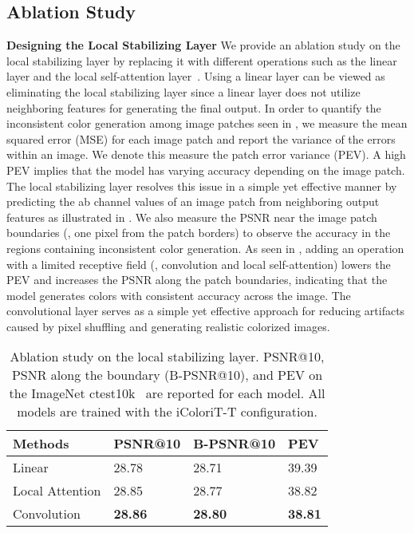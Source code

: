 \documentclass[10pt,twocolumn,letterpaper]{article}
\begin{document}
\subsection{Ablation Study}
\vspace{-0.1cm}
\noindent \textbf{Designing the Local Stabilizing Layer}
\label{sec:quali-ablation}
We provide an ablation study on the local stabilizing layer by replacing it with different operations such as the linear layer and the local self-attention layer~\cite{localattn}. 
Using a linear layer can be viewed as eliminating the local stabilizing layer since a linear layer does not utilize neighboring features for generating the final output. 
In order to quantify the inconsistent color generation among image patches seen in , we measure the mean squared error (MSE) for each image patch and report the variance of the errors within an image. 
We denote this measure the patch error variance (PEV). 
A high PEV implies that the model has varying accuracy depending on the image patch. 
The local stabilizing layer resolves this issue in a simple yet effective manner by predicting the ab channel values of an image patch from neighboring output features as illustrated in . 
We also measure the PSNR near the image patch boundaries (\ie, one pixel from the patch borders) to observe the accuracy in the regions containing inconsistent color generation. 
As seen in , adding an operation with a limited receptive field (\ie, convolution and local self-attention) lowers the PEV and increases the PSNR along the patch boundaries, indicating that the model generates colors with consistent accuracy across the image.
The convolutional layer serves as a simple yet effective approach for reducing artifacts caused by pixel shuffling and generating realistic colorized images. 

\begin{table}[t]
\centering
\begin{tabular}{@{}x{2.4cm}x{1.6cm}x{1.95cm}x{1.0cm}@{}}
\toprule
Methods               & PSNR@10        & B-PSNR@10            & PEV \\ \midrule
Linear                & 28.78          & 28.71                & 39.39            \\
Local Attention       & 28.85          & 28.77                & 38.82            \\ \midrule
Convolution           & \textbf{28.86} & \textbf{28.80}       & \textbf{38.81}   \\ \bottomrule
\end{tabular}
\vspace{0.1cm}
\caption{Ablation study on the local stabilizing layer. PSNR@10, PSNR along the boundary (B-PSNR@10), and PEV on the ImageNet ctest10k~\cite{ctest} are reported for each model. All models are trained with the iColoriT-T configuration.}
\label{tab:exp_ablation_conv}
\vspace{-0.3cm}
\end{table}
\end{document}
